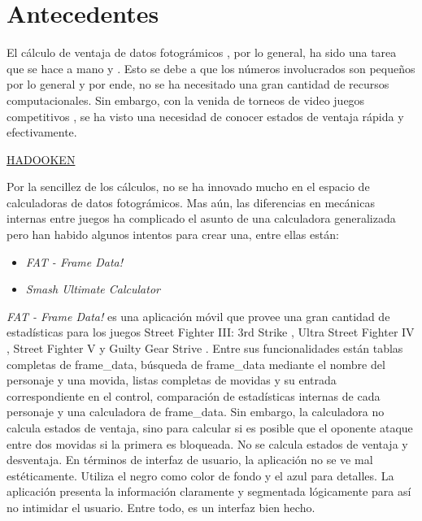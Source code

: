 \section{Antecedentes}

El cálculo de ventaja de datos fotográmicos \cite{noauthor_fighting_nodate-1}, por lo general, ha sido una tarea que se hace a mano \cite{noauthor_guide_nodate} y \cite{dustloop_using_2022}. Esto se debe a que los números involucrados son pequeños por lo general y por ende, no se ha necesitado una gran cantidad de recursos computacionales. Sin embargo, con la venida de  torneos de video juegos competitivos \cite{willingham_what_2018}, se ha visto una necesidad de conocer estados de ventaja rápida y efectivamente. 

\href{https://qph.cf2.quoracdn.net/main-qimg-35650aa12d02e1700face4fbf71f4cfd}{HADOOKEN} 
\cite{noauthor_grasshopper_nodate} 

Por la sencillez de los cálculos, no se ha innovado mucho en el espacio de calculadoras de datos fotográmicos. Mas aún, las diferencias en mecánicas internas entre juegos ha complicado el asunto de una calculadora generalizada pero han habido algunos intentos para crear una, entre ellas están:
\begin{itemize}
    \item \textit{FAT - Frame Data!} \cite{d4rkonion_fat_2022}
    \item \textit{Smash Ultimate Calculator} \cite{noauthor_rubendalssbu-calculator_nodate}
\end{itemize}

\textit{FAT - Frame Data!} es una aplicación móvil que provee una gran cantidad de estadísticas para los juegos Street Fighter III: 3rd Strike \cite{noauthor_street_2022}, Ultra Street Fighter IV \cite{noauthor_street_2022-1}, Street Fighter V \cite{noauthor_street_2022-2} y Guilty Gear Strive \cite{noauthor_guilty_2022}. Entre sus funcionalidades están tablas completas de \gls{frame_data}, búsqueda de \gls{frame_data} mediante el nombre del personaje y una movida, listas completas de movidas y su entrada correspondiente en el control, comparación de estadísticas internas de cada personaje y una calculadora de \gls{frame_data}. Sin embargo, la calculadora no calcula estados de ventaja, sino para calcular si es posible que el oponente ataque entre dos movidas si la primera es bloqueada. No se calcula estados de ventaja y desventaja. En términos de interfaz de usuario, la aplicación no se ve mal estéticamente. Utiliza el negro como color de fondo y el azul para detalles. La aplicación presenta la información claramente y segmentada lógicamente para así no intimidar el usuario. Entre todo, es un interfaz bien hecho.

